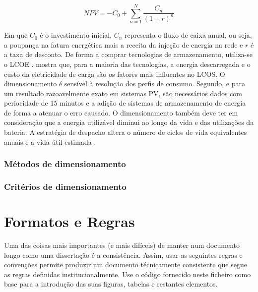 \[
NPV = -C_0 + \sum_{n=1}^{N} \frac{C_n}{(1+r)^n}
\]

Em que $C_0$ é o investimento inicial, $C_n$ representa o fluxo de caixa anual, ou seja, a poupança na fatura energética mais a receita da injeção de energia na rede e $r$ é a taxa de desconto. De forma a comprar tecnologias de armazenamento, utiliza-se o LCOE \cite{ Azuatalam2019}. \textcite{ Jlch2016} mostra que, para a maioria das tecnologias, a energia descarregada e o custo da eletricidade de carga são os fatores mais influentes no LCOS. 
O dimensionamento é sensível à resolução dos perfis de consumo. Segundo, \textcite{Azuatalam2019} e \textcite{Beck2016 } para um resultado razoavelmente exato em sistemas PV, são necessários dados com periocidade de 15 minutos e a adição de sistemas de armazenamento de energia de forma a atenuar o erro causado. 
O dimensionamento também deve ter em consideração que a energia utilizável diminui ao longo da vida e das utilizações da bateria.  A estratégia de despacho altera o número de ciclos de vida equivalentes anuais e a vida útil estimada \cite{ Azuatalam2019 }. 




 \subsubsection{Métodos de dimensionamento }
\label{sec:Ch2.1.7.2}


















\subsubsection{Critérios de dimensionamento}
\label{sec:Ch2.1.7.3}




\section{Formatos e Regras}
\label{sec:Ch2.3}

Uma das coisas mais importantes (e mais difíceis) de manter num documento longo como uma dissertação é a consistência. Assim, usar as seguintes regras e convenções permite produzir um documento técnicamente consistente que segue as regras definidas institucionalmente. Use o código fornecido neste ficheiro como base para a introdução das suas figuras, tabelas e restantes elementos. 

